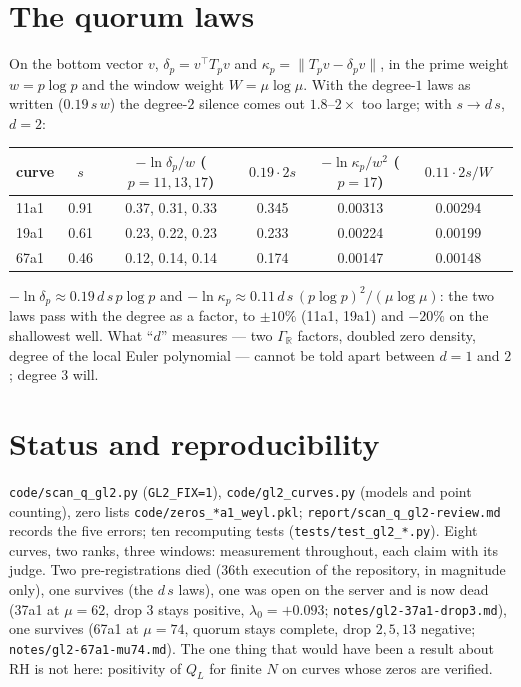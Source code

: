 \documentclass[11pt]{article}
\begin{document}
\section{The quorum laws}
On the bottom vector $v$, $\delta_p=v^{\!\top}T_pv$ and $\kappa_p=\|T_pv-\delta_pv\|$, in the prime weight $w=p\log p$ and the window weight $W=\mu\log\mu$. With the degree-$1$ laws as written ($0.19\,s\,w$) the degree-$2$ silence comes out $1.8$--$2\times$ too large; with $s\to d\,s$, $d=2$:
\begin{center}\small
\begin{tabular}{lcccccc}\toprule
curve & $s$ & $-\ln\delta_p/w$ ($p=11,13,17$) & $0.19\cdot2s$ & $-\ln\kappa_p/w^2$ ($p=17$) & $0.11\cdot2s/W$\\\midrule
11a1 & 0.91 & 0.37, 0.31, 0.33 & 0.345 & 0.00313 & 0.00294\\
19a1 & 0.61 & 0.23, 0.22, 0.23 & 0.233 & 0.00224 & 0.00199\\
67a1 & 0.46 & 0.12, 0.14, 0.14 & 0.174 & 0.00147 & 0.00148\\\bottomrule
\end{tabular}
\end{center}
$-\ln\delta_p\approx0.19\,d\,s\,p\log p$ and $-\ln\kappa_p\approx0.11\,d\,s\,(p\log p)^2/(\mu\log\mu)$: the two laws pass with the degree as a factor, to $\pm10\%$ (11a1, 19a1) and $-20\%$ on the shallowest well. What ``$d$'' measures --- two $\Gamma_{\mathbb R}$ factors, doubled zero density, degree of the local Euler polynomial --- cannot be told apart between $d=1$ and $2$; degree $3$ will.

\section*{Status and reproducibility}
\texttt{code/scan\_q\_gl2.py} (\texttt{GL2\_FIX=1}), \texttt{code/gl2\_curves.py} (models and point counting), zero lists \texttt{code/zeros\_*a1\_weyl.pkl}; \texttt{report/scan\_q\_gl2-review.md} records the five errors; ten recomputing tests (\texttt{tests/test\_gl2\_*.py}). Eight curves, two ranks, three windows: measurement throughout, each claim with its judge. Two pre-registrations died (36th execution of the repository, in magnitude only), one survives (the $d\,s$ laws), one was open on the server and is now dead (37a1 at $\mu=62$, drop $3$ stays positive, $\lambda_0=+0.093$; \texttt{notes/gl2-37a1-drop3.md}), one survives (67a1 at $\mu=74$, quorum stays complete, drop $2,5,13$ negative; \texttt{notes/gl2-67a1-mu74.md}). The one thing that would have been a result about RH is not here: positivity of $Q_L$ for finite $N$ on curves whose zeros are verified.
\end{document}
